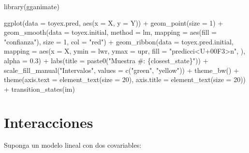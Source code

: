 \documentclass[
  12pt,
]{book}
\newenvironment{Shaded}{\begin{snugshade}}{\end{snugshade}}
\newcommand{\AttributeTok}[1]{\textcolor[rgb]{0.77,0.63,0.00}{#1}}
\newcommand{\DecValTok}[1]{\textcolor[rgb]{0.00,0.00,0.81}{#1}}
\newcommand{\FloatTok}[1]{\textcolor[rgb]{0.00,0.00,0.81}{#1}}
\newcommand{\FunctionTok}[1]{\textcolor[rgb]{0.00,0.00,0.00}{#1}}
\newcommand{\NormalTok}[1]{#1}
\newcommand{\SpecialCharTok}[1]{\textcolor[rgb]{0.00,0.00,0.00}{#1}}
\newcommand{\StringTok}[1]{\textcolor[rgb]{0.31,0.60,0.02}{#1}}
\theoremstyle{definition}
\theoremstyle{definition}
\theoremstyle{definition}
\theoremstyle{definition}
\theoremstyle{remark}
\begin{document}
\begin{Shaded}
\begin{Highlighting}[]
\FunctionTok{library}\NormalTok{(gganimate)}

\FunctionTok{ggplot}\NormalTok{(}\AttributeTok{data =}\NormalTok{ toyex.pred, }\FunctionTok{aes}\NormalTok{(}\AttributeTok{x =}\NormalTok{ X, }\AttributeTok{y =}\NormalTok{ Y)) }\SpecialCharTok{+} \FunctionTok{geom\_point}\NormalTok{(}\AttributeTok{size =} \DecValTok{1}\NormalTok{) }\SpecialCharTok{+}
    \FunctionTok{geom\_smooth}\NormalTok{(}\AttributeTok{data =}\NormalTok{ toyex.initial, }\AttributeTok{method =}\NormalTok{ lm,}
        \AttributeTok{mapping =} \FunctionTok{aes}\NormalTok{(}\AttributeTok{fill =} \StringTok{"confianza"}\NormalTok{), }\AttributeTok{size =} \DecValTok{1}\NormalTok{,}
        \AttributeTok{col =} \StringTok{"red"}\NormalTok{) }\SpecialCharTok{+} \FunctionTok{geom\_ribbon}\NormalTok{(}\AttributeTok{data =}\NormalTok{ toyex.pred.initial,}
    \AttributeTok{mapping =} \FunctionTok{aes}\NormalTok{(}\AttributeTok{x =}\NormalTok{ X, }\AttributeTok{ymin =}\NormalTok{ lwr, }\AttributeTok{ymax =}\NormalTok{ upr, }\AttributeTok{fill =} \StringTok{"predicci\textless{}U+00F3\textgreater{}n"}\NormalTok{,}
\NormalTok{        ), }\AttributeTok{alpha =} \FloatTok{0.3}\NormalTok{) }\SpecialCharTok{+} \FunctionTok{labs}\NormalTok{(}\AttributeTok{title =} \FunctionTok{paste0}\NormalTok{(}\StringTok{"Muestra \#: \{closest\_state\}"}\NormalTok{)) }\SpecialCharTok{+}
    \FunctionTok{scale\_fill\_manual}\NormalTok{(}\StringTok{"Intervalos"}\NormalTok{, }\AttributeTok{values =} \FunctionTok{c}\NormalTok{(}\StringTok{"green"}\NormalTok{,}
        \StringTok{"yellow"}\NormalTok{)) }\SpecialCharTok{+} \FunctionTok{theme\_bw}\NormalTok{() }\SpecialCharTok{+} \FunctionTok{theme}\NormalTok{(}\AttributeTok{axis.text =} \FunctionTok{element\_text}\NormalTok{(}\AttributeTok{size =} \DecValTok{20}\NormalTok{),}
    \AttributeTok{axis.title =} \FunctionTok{element\_text}\NormalTok{(}\AttributeTok{size =} \DecValTok{20}\NormalTok{)) }\SpecialCharTok{+} \FunctionTok{transition\_states}\NormalTok{(im)}
\end{Highlighting}
\end{Shaded}

\hypertarget{interacciones}{%
\section{Interacciones}\label{interacciones}}

Suponga un modelo lineal con dos covariables:
\end{document}
